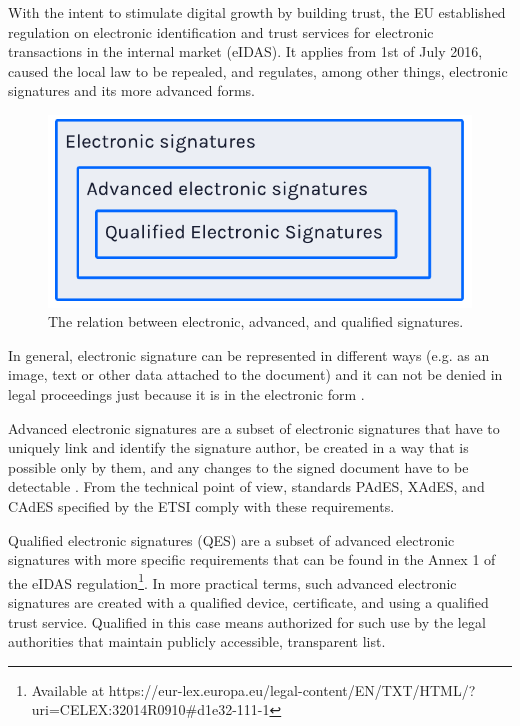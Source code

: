 \documentclass[a4paper,twocolumn]{article}
\begin{document}
With the intent to stimulate digital growth by building trust, the EU established regulation on electronic identification and trust services for electronic transactions in the internal market (eIDAS).
It applies from 1st of July 2016, caused the local law to be repealed, and regulates, among other things, electronic signatures and its more advanced forms.

\begin{figure}[ht]
    \includegraphics[width=\linewidth]{../paper/figures/electronic-advanced-qualified}
    \caption{The relation between electronic, advanced, and qualified signatures.}
    \centering
\end{figure}

In general, electronic signature can be represented in different ways (e.g. as an image, text or other data attached to the document) and it can not be denied in legal proceedings just because it is in the electronic form \cite{4}.

Advanced electronic signatures are a subset of electronic signatures that have to uniquely link and identify the signature author, be created in a way that is possible only by them, and any changes to the signed document have to be detectable \cite{5}.
From the technical point of view, standards PAdES, XAdES, and CAdES specified by the ETSI comply with these requirements.

Qualified electronic signatures (QES) are a subset of advanced electronic signatures with more specific requirements that can be found in the Annex 1 of the eIDAS regulation\footnote{Available at https://eur-lex.europa.eu/legal-content/EN/TXT/HTML/?uri=CELEX:32014R0910\#d1e32-111-1}.
In more practical terms, such advanced electronic signatures are created with a qualified device, certificate, and using a qualified trust service. Qualified in this case means authorized for such use by the legal authorities that maintain publicly accessible, transparent list.
\end{document}
